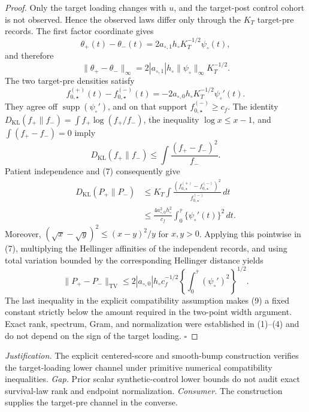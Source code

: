 \documentclass{article}
\begin{document}
\begin{proof}
Only the target loading changes with \(u\), and the target-post control
cohort is not observed.  Hence the observed laws differ only through the
\(K_T\) target-pre records.  The first factor coordinate gives
\[
 \theta_+(t)-\theta_-(t)
 =2a_{\circ,1}h_\circ K_T^{-1/2}\psi_\circ(t),               \tag{5}
\]
and therefore
\[
 \|\theta_+-\theta_-\|_\infty
 =2|a_{\circ,1}|h_\circ\|\psi_\circ\|_\infty K_T^{-1/2}.    \tag{6}
\]
The two target-pre densities satisfy
\[
 f_{0,\star}^{(+)}(t)-f_{0,\star}^{(-)}(t)
 =-2a_{\circ,0}h_\circ K_T^{-1/2}\psi_\circ'(t).             \tag{7}
\]
They agree off \(\operatorname{supp}(\psi_\circ')\), and on that support
\(f_{0,\star}^{(-)}\ge c_f\).  The identity
\(D_{\mathrm{KL}}(f_+\|f_-)=\int f_+\log(f_+/f_-)\), the inequality
\(\log x\le x-1\), and \(\int(f_+-f_-)=0\) imply
\[
 D_{\mathrm{KL}}(f_+\|f_-)
 \le\int\frac{(f_+-f_-)^2}{f_-}.
\]
Patient independence and (7) consequently give
\[
 \begin{split}
 D_{\mathrm{KL}}(P_+\|P_-)
 &\le K_T\int\frac{(f_{0,\star}^{(+)}-f_{0,\star}^{(-)})^2}
                         {f_{0,\star}^{(-)}}\,dt\\
 &\le\frac{4a_{\circ,0}^2h_\circ^2}{c_f}
       \int_0^{\bar\tau}\{\psi_\circ'(t)\}^2\,dt.
 \end{split}                                                \tag{8}
\]
Moreover,
\((\sqrt{x}-\sqrt y)^2\le(x-y)^2/y\) for \(x,y>0\).  Applying this
pointwise in (7), multiplying the Hellinger affinities of the independent
records, and using total variation bounded by the corresponding Hellinger
distance yields
\[
 \|P_+-P_-\|_{\mathrm{TV}}
 \le2|a_{\circ,0}|h_\circ c_f^{-1/2}
       \left\{\int_0^{\bar\tau}(\psi_\circ')^2\right\}^{1/2}. \tag{9}
\]
The last inequality in the explicit compatibility assumption makes (9) a
fixed constant strictly below the amount required in the two-point width
argument.  Exact rank, spectrum, Gram, and normalization were established
in (1)--(4) and do not depend on the sign of the target loading. \(\square\)
\end{proof}
\par\smallskip\noindent \textit{Justification.} The explicit centered-score and smooth-bump construction verifies the target-loading lower channel under primitive numerical compatibility inequalities. \textit{Gap.} Prior scalar synthetic-control lower bounds do not audit exact survival-law rank and endpoint normalization. \textit{Consumer.} The construction supplies the target-pre channel in the converse.
\end{document}

